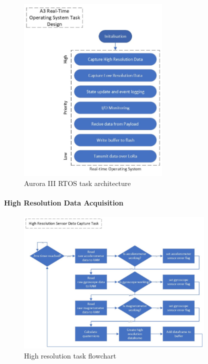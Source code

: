 \begin{figure}[ht!]
  \begin{center}
    \hspace{-3.5cm}\includegraphics[width=0.65\textwidth]{./img/Section_4_2_2.jpeg}
  \end{center}
  \caption{Aurora III RTOS task architecture}\label{fig:}
\end{figure}


\paragraph{High Resolution Data Acquisition}
\begin{figure}[ht!]
  \begin{center}
    \hspace{-3.5em}\includegraphics[width=0.85\textwidth]{./img/Section_4_2_2_1.jpeg}
  \end{center}
  \caption{High resolution task flowchart}\label{fig:flowchart-high_res}
\end{figure}

